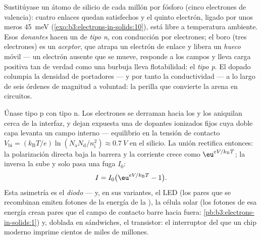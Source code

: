 \begin{definition}[Dopado]\label{def:b3:electrons-in-solids:doping}
Sustitúyase un átomo de silicio de cada millón por fósforo (cinco electrones
de valencia): cuatro enlaces quedan satisfechos y el quinto electrón,
ligado por unos meros \qty{45}{meV}
(\cref{exo:b3:electrons-in-solids:10}), está libre a temperatura
ambiente. Esos \emph{donantes} hacen un  de \emph{tipo n},
con conducción por electrones; el boro (tres electrones)
es un \emph{aceptor}, que atrapa un electrón de enlace y libera un
\emph{hueco} móvil --- un electrón ausente que se mueve, responde a los
campos y lleva carga positiva tan de verdad como una burbuja
lleva flotabilidad: el \emph{tipo p}. El dopado columpia la densidad de portadores
--- y por tanto la conductividad --- a lo largo de seis órdenes de magnitud a
voluntad: la perilla que convierte la arena en circuitos.
\end{definition}

\begin{proposition}[La unión p--n]\label{prop:b3:electrons-in-solids:junction}
Únase tipo p con tipo n. Los electrones se derraman hacia los  y
los aniquilan cerca de la interfaz, y dejan expuesta una \emph{} de dopantes ionizados fijos cuya doble capa levanta un
campo interno --- equilibrio en la tensión de contacto
$V_{\text{bi}} = (k_{\text{B}}T/e)
\ln(N_{\text{a}}N_{\text{d}}/n_{\text{i}}^2) \approx
\qty{0.7}{V}$ en el silicio. La unión rectifica entonces: la polarización
directa baja la barrera y la corriente crece como
$\eu^{eV/k_{\text{B}}T}$; la inversa la sube y solo pasa una
fuga $I_0$:
\[
I = I_0\big(\eu^{eV/k_{\text{B}}T} - 1\big) .
\]
Esta asimetría es el \emph{diodo} --- y, en sus variantes,
el LED (los pares que se recombinan emiten fotones de la energía de la ), la célula
solar (los fotones de esa energía crean pares que el campo de contacto
barre hacia fuera: \cref{pb:b3:electrons-in-solids:1}) y, doblada
en sándwiches, el transistor: el interruptor del que un chip
moderno imprime cientos de miles de millones.
\end{proposition}
\admitted

